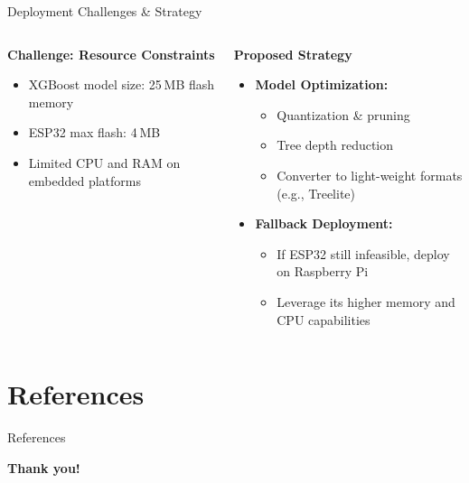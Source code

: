 \documentclass[aspectratio=169,xcolor=dvipsnames]{beamer}
\begin{document}
\begin{frame}{Deployment Challenges \& Strategy}
\begin{columns}[T]
  \begin{column}{0.48\textwidth}
    \begin{block}{{\textbf{Challenge: Resource Constraints}}}
      \begin{itemize}
        \item XGBoost model size: 25 MB flash memory  
        \item ESP32 max flash: 4 MB  
        \item Limited CPU and RAM on embedded platforms  
      \end{itemize}
    \end{block}
  \end{column}
  
  \begin{column}{0.48\textwidth}
    \begin{exampleblock}{{\textbf{Proposed Strategy}}}
      \begin{itemize}
        \item \textbf{Model Optimization:}  
          \begin{itemize}
            \item Quantization \& pruning  
            \item Tree depth reduction  
            \item Converter to light-weight formats (e.g., Treelite)
          \end{itemize}
        \item \textbf{Fallback Deployment:}  
          \begin{itemize}
            \item If ESP32 still infeasible, deploy on Raspberry Pi  
            \item Leverage its higher memory and CPU capabilities  
          \end{itemize}
      \end{itemize}
    \end{exampleblock}
  \end{column}
\end{columns}
\end{frame} 

\section{References}
\begin{frame}[allowframebreaks]{References}
    \small
    \printbibliography
\end{frame}


\begin{frame}[plain]
  \centering
  \Huge \textbf{Thank you!}
\end{frame}
\end{document}
